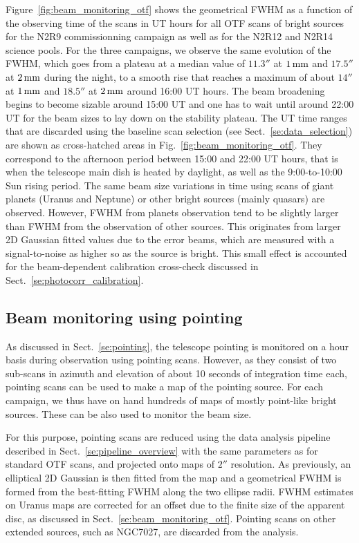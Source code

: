 Figure~\ref{fig:beam_monitoring_otf} shows the geometrical FWHM as a
function of the observing time of the scans in UT hours for all OTF
scans of bright sources for the N2R9 commissionning campaign as well
as for the N2R12 and N2R14 science pools. For the three campaigns, we
observe the same evolution of the FWHM, which goes from a plateau at a
median value of $11.3''$ at $1\,\rm{mm}$ and $17.5''$ at $2\,\rm{mm}$
during the night, to a smooth rise that reaches a maximum of about $14''$
at $1\,\rm{mm}$ and $18.5''$ at $2\,\rm{mm}$ around 16:00 UT
hours. The beam broadening begins to become sizable around 15:00 UT
and one has to wait until around 22:00 UT for the beam sizes to lay
down on the stability plateau. The UT time ranges that are discarded
using the baseline scan selection (see
Sect.~\ref{se:data_selection}) are shown as cross-hatched areas in
Fig.~\ref{fig:beam_monitoring_otf}. They correspond to the afternoon
period between 15:00 and 22:00 UT hours, that is when the
telescope main dish is heated by daylight, as well as the
9:00-to-10:00 Sun rising period. The same beam size variations in time
using scans of giant planets (Uranus and Neptune) or other bright
sources (mainly quasars) are observed. However, FWHM from planets
observation tend to be slightly larger than FWHM from the observation
of other sources. This originates from larger 2D Gaussian fitted
values due to the error beams, which are measured with a
signal-to-noise as higher so as the source is bright. This small
effect is accounted for the beam-dependent calibration cross-check
discussed in Sect.~\ref{se:photocorr_calibration}.



\subsection{Beam monitoring using pointing}
\label{se:beam_monitoring_pointing}

As discussed in Sect.~\ref{se:pointing}, the telescope pointing is
monitored on a hour basis during observation using pointing
scans. However, as they consist of two sub-scans in azimuth and
elevation of about 10 seconds of integration time each, pointing scans
can be used to make a map of the pointing source. For each campaign,
we thus have on hand hundreds of maps of mostly point-like bright
sources. These can be also used to monitor the beam size.

For this purpose, pointing scans are reduced using
the data analysis pipeline described in
Sect.~\ref{se:pipeline_overview} with the same parameters as for
standard OTF scans, and projected onto maps of $2''$ resolution.
As previously, an elliptical 2D Gaussian is then fitted from the map
and a geometrical FWHM is formed from the best-fitting FWHM along the
two ellipse radii. FWHM estimates on Uranus maps are corrected for an
offset due to the finite size of the apparent disc, as discussed in
Sect.~\ref{se:beam_monitoring_otf}. Pointing scans on other extended
sources, such as NGC7027, are discarded from the analysis. 


